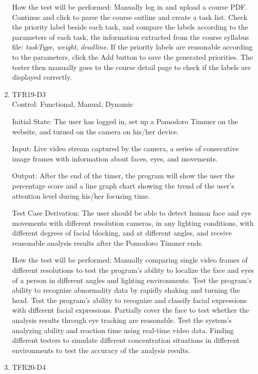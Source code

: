 \documentclass[12pt, titlepage]{article}
\begin{document}
\begin{enumerate}
  How the test will be performed: Manually log in and upload a course PDF. Continue and click to parse the course outline and create a task list. Check the priority label beside each task, and compare the labels according to the parameters of each task, the information extracted from the course syllabus file: \textit{taskType}, \textit{weight}, \textit{deadline}. If the priority labels are reasonable according to the parameters, click the Add button to save the generated priorities. The tester then manually goes to the course detail page to check if the labels are displayed correctly.

  \item{TFR19-D3\\} \label{TFR19-D3}
  Control: Functional, Manual, Dynamic
            
  Initial State: The user has logged in, set up a Pomodoro Timmer on the website, and turned on the camera on his/her device.
            
  Input: Live video stream captured by the camera, a series of consecutive image frames with information about faces, eyes, and movements.
            
  Output: After the end of the timer, the program will show the user the percentage score and a line graph chart showing the trend of the user's attention level during his/her focusing time.
  
  Test Case Derivation: The user should be able to detect human face and eye movements with different resolution cameras, in any lighting conditions, with different degrees of facial blocking, and at different angles, and receive reasonable analysis results after the Pomodoro Timmer ends. 
            
  How the test will be performed: Manually comparing single video frames of different resolutions to test the program's ability to localize the face and eyes of a person in different angles and lighting environments. Test the program's ability to recognize abnormality data by rapidly shaking and turning the head. Test the program's ability to recognize and classify facial expressions with different facial expressions. Partially cover the face to test whether the analysis results through eye tracking are reasonable. Test the system's analyzing ability and reaction time using real-time video data. Finding different testers to simulate different concentration situations in different environments to test the accuracy of the analysis results.

  \item{TFR20-D4\\} \label{TFR20-D4}


\end{enumerate}
\end{document}
